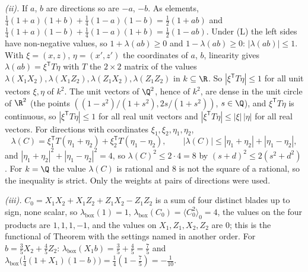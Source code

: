 \emph{(ii).} If $a$, $b$ are directions so are $-a$, $-b$. As elements, $\tfrac14(1 + a)(1 + b) + \tfrac14(1 - a)(1 - b) = \tfrac12(1 + ab)$ and $\tfrac14(1 + a)(1 - b) + \tfrac14(1 - a)(1 + b) = \tfrac12(1 - ab)$. Under (L) the left sides have non-negative values, so $1 + \lambda(ab) \ge 0$ and $1 - \lambda(ab) \ge 0$: $|\lambda(ab)| \le 1$. With $\xi = (x, z)$, $\eta = (x', z')$ the coordinates of $a$, $b$, linearity gives $\lambda(ab) = \xi^{\mathsf{T}}T\eta$ with $T$ the $2 \times 2$ matrix of the values $\lambda(X_{1}X_{2}), \lambda(X_{1}Z_{2}), \lambda(Z_{1}X_{2}), \lambda(Z_{1}Z_{2})$ in $k \subseteq \R$. So $|\xi^{\mathsf{T}}T\eta| \le 1$ for all unit vectors $\xi, \eta$ of $k^{2}$. The unit vectors of $\Q^{2}$, hence of $k^{2}$, are dense in the unit circle of $\R^{2}$ (the points $((1 - s^{2})/(1 + s^{2}), 2s/(1 + s^{2}))$, $s \in \Q$), and $\xi^{\mathsf{T}}T\eta$ is continuous, so $|\xi^{\mathsf{T}}T\eta| \le 1$ for all real unit vectors and $|\xi^{\mathsf{T}}T\eta| \le |\xi|\,|\eta|$ for all real vectors. For directions with coordinates $\xi_{1}, \xi_{2}, \eta_{1}, \eta_{2}$,
\[
\lambda(C) = \xi_{1}^{\mathsf{T}}T(\eta_{1} + \eta_{2}) + \xi_{2}^{\mathsf{T}}T(\eta_{1} - \eta_{2}), \qquad |\lambda(C)| \le |\eta_{1} + \eta_{2}| + |\eta_{1} - \eta_{2}| ,
\]
and $|\eta_{1} + \eta_{2}|^{2} + |\eta_{1} - \eta_{2}|^{2} = 4$, so $\lambda(C)^{2} \le 2 \cdot 4 = 8$ by $(s + d)^{2} \le 2(s^{2} + d^{2})$. For $k = \Q$ the value $\lambda(C)$ is rational and $8$ is not the square of a rational, so the inequality is strict. Only the weights at pairs of directions were used.

\emph{(iii).} $C_{0} = X_{1}X_{2} + X_{1}Z_{2} + Z_{1}X_{2} - Z_{1}Z_{2}$ is a sum of four distinct blades up to sign, none scalar, so $\lambda_{\mathrm{box}}(1) = 1$, $\lambda_{\mathrm{box}}(C_{0}) = \langle C_{0}^{2}\rangle_{0} = 4$, the values on the four products are $1, 1, 1, -1$, and the values on $X_{1}, Z_{1}, X_{2}, Z_{2}$ are $0$; this is the functional of Theorem  with the settings named in another order. For $b = \tfrac35X_{2} + \tfrac45Z_{2}$: $\lambda_{\mathrm{box}}(X_{1}b) = \tfrac35 + \tfrac45 = \tfrac75$ and $\lambda_{\mathrm{box}}\bigl(\tfrac14(1 + X_{1})(1 - b)\bigr) = \tfrac14(1 - \tfrac75) = -\tfrac{1}{10}$.

